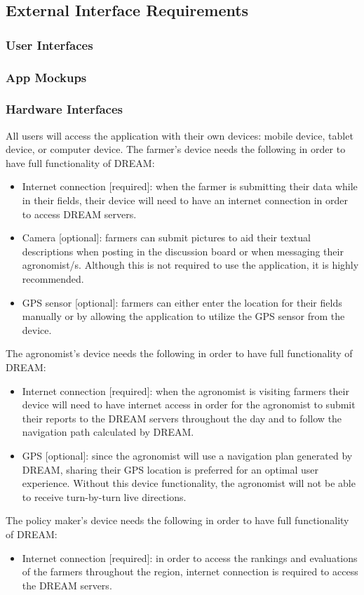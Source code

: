 \subsection{External Interface Requirements}

\subsubsection{User Interfaces}
\subsubsection{App Mockups}

\subsubsection{Hardware Interfaces}
\begin{flushleft}
All users will access the application with their own devices: mobile device, tablet device, or computer device. 
The farmer's device needs the following in order to have full functionality of DREAM:
\begin{itemize}
\item Internet connection [required]: when the farmer is submitting their data while in their fields, their device will need to have an internet connection in order to access DREAM servers.
\item Camera [optional]: farmers can submit pictures to aid their textual descriptions when posting in the discussion board or when messaging their agronomist/s. Although this is not required to use the application, it is highly recommended. 
\item GPS sensor [optional]: farmers can either enter the location for their fields manually or by allowing the application to utilize the GPS sensor from the device. 
\end{itemize}

The agronomist's device needs the following in order to have full functionality of DREAM:
\begin{itemize}
\item Internet connection [required]: when the agronomist is visiting farmers their device will need to have internet access in order for the agronomist to submit their reports to the DREAM servers throughout the day and to follow the navigation path calculated by DREAM.
\item GPS [optional]: since the agronomist will use a navigation plan generated by DREAM, sharing their GPS location is preferred for an optimal user experience. Without this device functionality, the agronomist will not be able to receive turn-by-turn live directions. 
\end{itemize}

The policy maker's device needs the following in order to have full functionality of DREAM:
\begin{itemize}
\item Internet connection [required]: in order to access the rankings and evaluations of the farmers throughout the region, internet connection is required to access the DREAM servers. 
\end{itemize}
\end{flushleft}

